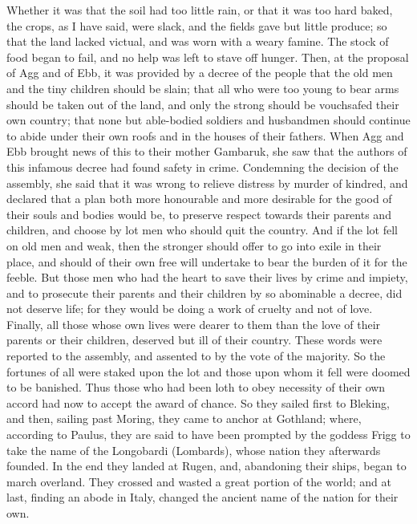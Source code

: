 \documentclass[10pt,a4paper]{report}
\begin{document}
Whether it was that the soil had too little rain, or that it was too hard baked, the crops, as I have said, were slack, and the fields gave but little produce; so that the land lacked victual, and was worn with a weary famine. The stock of food began to fail, and no help was left to stave off hunger. Then, at the proposal of Agg and of Ebb, it was provided by a decree of the people that the old men and the tiny children should be slain; that all who were too young to bear arms should be taken out of the land, and only the strong should be vouchsafed their own country; that none but able-bodied soldiers and husbandmen should continue to abide under their own roofs and in the houses of their fathers. When Agg and Ebb brought news of this to their mother Gambaruk, she saw that the authors of this infamous decree had found safety in crime. Condemning the decision of the assembly, she said that it was wrong to relieve distress by murder of kindred, and declared that a plan both more honourable and more desirable for the good of their souls and bodies would be, to preserve respect towards their parents and children, and choose by lot men who should quit the country. And if the lot fell on old men and weak, then the stronger should offer to go into exile in their place, and should of their own free will undertake to bear the burden of it for the feeble. But those men who had the heart to save their lives by crime and impiety, and to prosecute their parents and their children by so abominable a decree, did not deserve life; for they would be doing a work of cruelty and not of love. Finally, all those whose own lives were dearer to them than the love of their parents or their children, deserved but ill of their country. These words were reported to the assembly, and assented to by the vote of the majority. So the fortunes of all were staked upon the lot and those upon whom it fell were doomed to be banished. Thus those who had been loth to obey necessity of their own accord had now to accept the award of chance. So they sailed first to Bleking, and then, sailing past Moring, they came to anchor at Gothland; where, according to Paulus, they are said to have been prompted by the goddess Frigg to take the name of the Longobardi (Lombards), whose nation they afterwards founded. In the end they landed at Rugen, and, abandoning their ships, began to march overland. They crossed and wasted a great portion of the world; and at last, finding an abode in Italy, changed the ancient name of the nation for their own.\\
\end{document}
